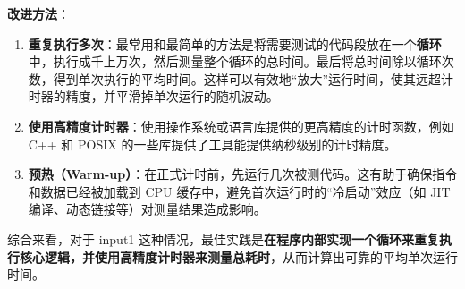 \textbf{改进方法}：
\begin{enumerate}
    \item \textbf{重复执行多次}：最常用和最简单的方法是将需要测试的代码段放在一个\textbf{循环}中，执行成千上万次，然后测量整个循环的总时间。最后将总时间除以循环次数，得到单次执行的平均时间。这样可以有效地“放大”运行时间，使其远超计时器的精度，并平滑掉单次运行的随机波动。
    \item \textbf{使用高精度计时器}：使用操作系统或语言库提供的更高精度的计时函数，例如 C++ 和 POSIX 的一些库提供了工具能提供纳秒级别的计时精度。
    \item \textbf{预热（Warm-up）}：在正式计时前，先运行几次被测代码。这有助于确保指令和数据已经被加载到 CPU 缓存中，避免首次运行时的“冷启动”效应（如 JIT 编译、动态链接等）对测量结果造成影响。
\end{enumerate}
综合来看，对于 input1 这种情况，最佳实践是\textbf{在程序内部实现一个循环来重复执行核心逻辑，并使用高精度计时器来测量总耗时}，从而计算出可靠的平均单次运行时间。
